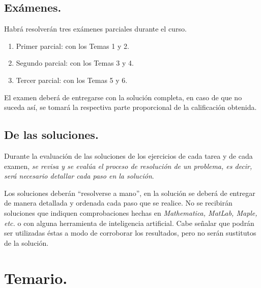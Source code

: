 \documentclass[12pt]{article}
\numberwithin{equation}{section}
\begin{document}
\subsection{Exámenes.}

Habrá resolverán tres exámenes parciales durante el curso.
\begin{enumerate}[label=\alph*), leftmargin=1.5\parindent]
\item Primer parcial: con los Temas 1 y 2.
\item Segundo parcial: con los Temas 3 y 4.
\item Tercer parcial: con los Temas 5 y 6.
\end{enumerate}

El examen deberá de entregarse con la solución completa, en caso de que no suceda así, se tomará la respectiva parte proporcional de la calificación obtenida.

\subsection{De las soluciones.}

Durante la evaluación de las soluciones de los ejercicios de cada tarea y de cada examen, \emph{se revisa y se evalúa el proceso de resolución de un problema, es decir, será necesario detallar cada paso en la solución}.

Los soluciones deberán \enquote{resolverse a mano}, en la solución se deberá de entregar de manera detallada y ordenada cada paso que se realice. No se recibirán soluciones que indiquen comprobaciones hechas en \emph{Mathematica, MatLab, Maple, etc.} o con alguna herramienta de inteligencia artificial. Cabe señalar que podrán ser utilizadas éstas a modo de corroborar los resultados, pero no serán sustitutos de la solución.

\section{Temario.}
\end{document}
